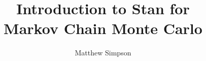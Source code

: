 \documentclass[xcolor=dvipsnames]{beamer}
\title[Stan for Spatial]{Introduction to Stan for \\
Markov Chain Monte Carlo}
\author[Matt Simpson]{Matthew Simpson}
\institute[Mizzou Statistics]{Department of Statistics, University of Missouri}
\begin{document}
\begin{frame}
\titlepage
\end{frame}

\end{document}
